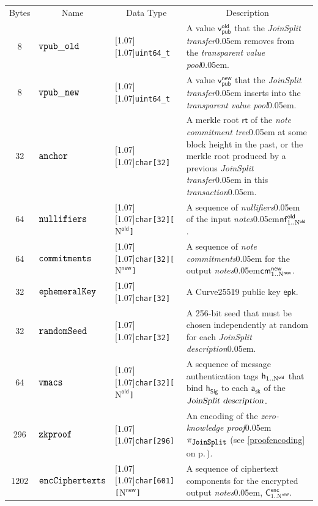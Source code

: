 \documentclass{article}
\renewcommand{\emph}[1]{\hspace{0.15em}{\fontfamily{pnc}\selectfont\scalebox{1.02}[0.999]{\textit{#1}}}\hspace{0.02em}}
\let\oldtexttt\texttt
\let\oldmathtt\mathtt
\renewcommand{\texttt}[1]{\scalebox{1.02}[1.07]{\oldtexttt{#1}}}
\renewcommand{\mathtt}[1]{\scalebox{1.02}[1.07]{$\oldmathtt{#1}$}}
\newcommand{\crossref}[1]{\autoref{#1}\, \emph{`\nameref*{#1}\kern -0.05em'} on p.\,\pageref*{#1}}
\newcommand{\changedcolor}{magenta}
\newcommand{\setchanged}{\color{\changedcolor}}
\newcommand{\term}[1]{\textsl{#1}\kern 0.05em\xspace}
\newcommand{\notes}{\term{notes}}
\newcommand{\noteCommitments}{\term{note commitments}}
\newcommand{\noteCommitmentTree}{\term{note commitment tree}}
\newcommand{\joinSplitDescription}{\term{JoinSplit description}}
\newcommand{\joinSplitTransfer}{\term{JoinSplit transfer}}
\newcommand{\zeroKnowledgeProof}{\term{zero-knowledge proof}}
\newcommand{\transaction}{\term{transaction}}
\newcommand{\transparentValuePool}{\term{transparent value pool}}
\newcommand{\nullifiers}{\term{nullifiers}}
\newcommand{\AuthPrivate}{\mathsf{a_{sk}}}
\newcommand{\enc}{\mathsf{enc}}
\newcommand{\EphemeralPublic}{\mathsf{epk}}
\newcommand{\Ctext}{\mathsf{C}}
\newcommand{\TransmitCiphertext}[1]{\Ctext^\enc_{#1}}
\newcommand{\cmNew}[1]{\mathsf{{cm}^{new}_\mathnormal{#1}}}
\newcommand{\nf}{\mathsf{nf}}
\newcommand{\nfOld}[1]{\nf^\mathsf{old}_\mathnormal{#1}}
\newcommand{\vpubOldField}{\mathtt{vpub\_old}}
\newcommand{\vpubNewField}{\mathtt{vpub\_new}}
\newcommand{\anchorField}{\mathtt{anchor}}
\newcommand{\nullifiersField}{\mathtt{nullifiers}}
\newcommand{\commitments}{\mathtt{commitments}}
\newcommand{\ephemeralKey}{\mathtt{ephemeralKey}}
\newcommand{\encCiphertexts}{\mathtt{encCiphertexts}}
\newcommand{\randomSeed}{\mathtt{randomSeed}}
\newcommand{\heading}[1]{\multicolumn{1}{c|}{#1}}
\newcommand{\type}[1]{\texttt{#1}}
\newcommand{\JoinSplit}{\text{\footnotesize\texttt{JoinSplit}}}
\newcommand{\Proof}{\pi}
\newcommand{\JoinSplitProof}{\Proof_{\JoinSplit}}
\newcommand{\zkproof}{\mathtt{zkproof}}
\newcommand{\hSig}{\mathsf{h_{Sig}}}
\newcommand{\h}[1]{\mathsf{h_{\mathnormal{#1}}}}
\newcommand{\NOld}{\mathrm{N}^\mathsf{old}}
\newcommand{\NNew}{\mathrm{N}^\mathsf{new}}
\newcommand{\allN}[1]{\mathrm{1}..\mathrm{N}^\mathsf{#1}}
\newcommand{\allOld}{\allN{old}}
\newcommand{\allNew}{\allN{new}}
\newcommand{\vmacs}{\mathtt{vmacs}}
\newcommand{\vpubOld}{\mathsf{v_{pub}^{old}}}
\newcommand{\vpubNew}{\mathsf{v_{pub}^{new}}}
\newcommand{\rt}{\mathsf{rt}}
\begin{document}
\begin{center}
\begin{tabularx}{0.92\textwidth}{|c|l|l|X|}
\hline
Bytes & \heading{Name} & \heading{Data Type} & \heading{Description} \\
\hhline{|=|=|=|=|}

\setchanged 8 &\setchanged $\vpubOldField$ &\setchanged \type{uint64\_t} &\mbox{}\setchanged
A value $\vpubOld$ that the \joinSplitTransfer removes from the \transparentValuePool. \\ \hline

8 & $\vpubNewField$ & \type{uint64\_t} & A value $\vpubNew$ that the \joinSplitTransfer inserts
into the \transparentValuePool. \\ \hline

32 & $\anchorField$ & \type{char[32]} & A merkle root $\rt$ of the \noteCommitmentTree at
some block height in the past, or the merkle root produced by a previous \joinSplitTransfer in
this \transaction. \\ \hline

64 & $\nullifiersField$ & \type{char[32][$\NOld$]} & A sequence of \nullifiers of the input
\notes $\nfOld{\allOld}$. \\ \hline

64 & $\commitments$ & \type{char[32][$\NNew$]} & A sequence of \noteCommitments for the
output \notes $\cmNew{\allNew}$. \\ \hline

\setchanged 32 &\setchanged $\ephemeralKey$ &\setchanged \type{char[32]} &\mbox{}\setchanged
A Curve25519 public key $\EphemeralPublic$. \\ \hline

\setchanged 32 &\setchanged $\randomSeed$ &\setchanged \type{char[32]} &\mbox{}\setchanged
A 256-bit seed that must be chosen independently at random for each \joinSplitDescription. \\ \hline

64 & $\vmacs$ & \type{char[32][$\NOld$]} & A sequence of message authentication tags
$\h{\allOld}$ that bind $\hSig$ to each $\AuthPrivate$ of the
$\joinSplitDescription$. \\ \hline

296 & $\zkproof$ & \type{char[296]} & An encoding of the \zeroKnowledgeProof $\JoinSplitProof$
(see \crossref{proofencoding}). \\ \hline

1202 & $\encCiphertexts$ & \type{char[601][$\NNew$]} & A sequence of ciphertext
components for the encrypted output \notes, $\TransmitCiphertext{\allNew}$. \\ \hline

\end{tabularx}
\end{center}
\end{document}
